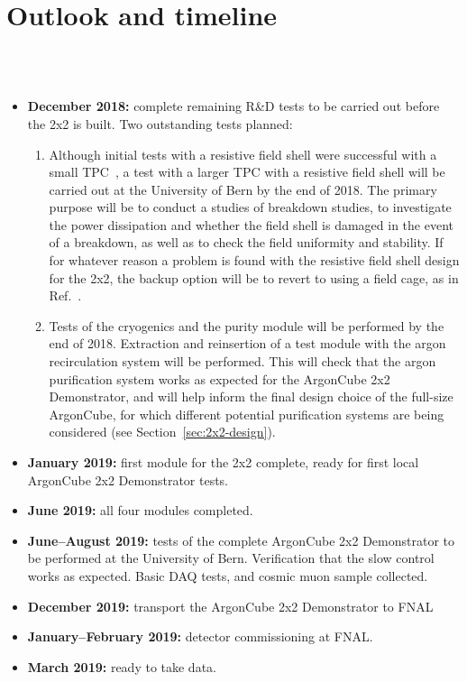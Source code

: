 \section{Outlook and timeline}
\label{sec:outlook}

\\
\\
\begin{itemize}
\item {\bf December 2018:} complete remaining R\&D tests to be carried out before the 2x2 is built. Two outstanding tests planned:
  \begin{enumerate}
  \item Although initial tests with a resistive field shell were successful with a small TPC~\addcite {}, a test with a larger TPC with a resistive field shell will be carried out at the University of Bern by the end of 2018. The primary purpose will be to conduct a studies of breakdown studies, to investigate the power dissipation and whether the field shell is damaged in the event of a breakdown, as well as to check the field uniformity and stability. If for whatever reason a problem is found with the resistive field shell design for the 2x2, the backup option will be to revert to using a field cage, as in Ref.~\cite{argoncube_loi}.
  \item Tests of the cryogenics and the purity module will be performed by the end of 2018. Extraction and reinsertion of a test module with the argon recirculation system will be performed. This will check that the argon purification system works as expected for the ArgonCube 2x2 Demonstrator, and will help inform the final design choice of the full-size ArgonCube, for which different potential purification systems are being considered (see Section~\ref{sec:2x2-design}).
  \end{enumerate}
\item {\bf January 2019:} first module for the 2x2 complete, ready for first local ArgonCube 2x2 Demonstrator tests.
\item {\bf June 2019:} all four modules completed.
\item {\bf June--August 2019:} tests of the complete ArgonCube 2x2 Demonstrator to be performed at the University of Bern. Verification that the slow control works as expected. Basic DAQ tests, and cosmic muon sample collected.
\item {\bf December 2019:} transport the ArgonCube 2x2 Demonstrator to FNAL
\item {\bf January--February 2019:} detector commissioning at FNAL.
\item {\bf March 2019:} ready to take data. 
\end{itemize}
